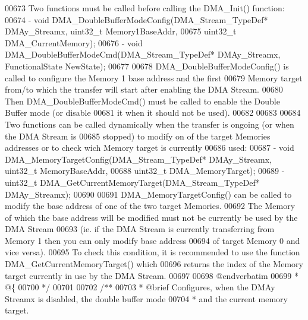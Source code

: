 \begin{DoxyCode}
00673 \textcolor{comment}{  Two functions must be called before calling the DMA\_Init() function:}
00674 \textcolor{comment}{   - void DMA\_DoubleBufferModeConfig(DMA\_Stream\_TypeDef* DMAy\_Streamx, uint32\_t Memory1BaseAddr,}
00675 \textcolor{comment}{                                uint32\_t DMA\_CurrentMemory);}
00676 \textcolor{comment}{   - void DMA\_DoubleBufferModeCmd(DMA\_Stream\_TypeDef* DMAy\_Streamx, FunctionalState NewState);}
00677 \textcolor{comment}{   }
00678 \textcolor{comment}{  DMA\_DoubleBufferModeConfig() is called to configure the Memory 1 base address and the first}
00679 \textcolor{comment}{  Memory target from/to which the transfer will start after enabling the DMA Stream.}
00680 \textcolor{comment}{  Then DMA\_DoubleBufferModeCmd() must be called to enable the Double Buffer mode (or disable }
00681 \textcolor{comment}{  it when it should not be used).}
00682 \textcolor{comment}{  }
00683 \textcolor{comment}{   }
00684 \textcolor{comment}{  Two functions can be called dynamically when the transfer is ongoing (or when the DMA Stream is }
00685 \textcolor{comment}{  stopped) to modify on of the target Memories addresses or to check wich Memory target is currently}
00686 \textcolor{comment}{   used:}
00687 \textcolor{comment}{    - void DMA\_MemoryTargetConfig(DMA\_Stream\_TypeDef* DMAy\_Streamx, uint32\_t MemoryBaseAddr,}
00688 \textcolor{comment}{                            uint32\_t DMA\_MemoryTarget);}
00689 \textcolor{comment}{    - uint32\_t DMA\_GetCurrentMemoryTarget(DMA\_Stream\_TypeDef* DMAy\_Streamx);}
00690 \textcolor{comment}{}
00691 \textcolor{comment}{  DMA\_MemoryTargetConfig() can be called to modify the base address of one of the two target Memories.}
00692 \textcolor{comment}{  The Memory of which the base address will be modified must not be currently be used by the DMA
       Stream}
00693 \textcolor{comment}{  (ie. if the DMA Stream is currently transferring from Memory 1 then you can only modify base address}
00694 \textcolor{comment}{  of target Memory 0 and vice versa).}
00695 \textcolor{comment}{  To check this condition, it is recommended to use the function DMA\_GetCurrentMemoryTarget() which}
00696 \textcolor{comment}{  returns the index of the Memory target currently in use by the DMA Stream.}
00697 \textcolor{comment}{}
00698 \textcolor{comment}{@endverbatim}
00699 \textcolor{comment}{  * @\{}
00700 \textcolor{comment}{  */}
00701 
00702 \textcolor{comment}{/**}
00703 \textcolor{comment}{  * @brief  Configures, when the DMAy Streamx is disabled, the double buffer mode }
00704 \textcolor{comment}{  *         and the current memory target.}

\end{DoxyCode}
